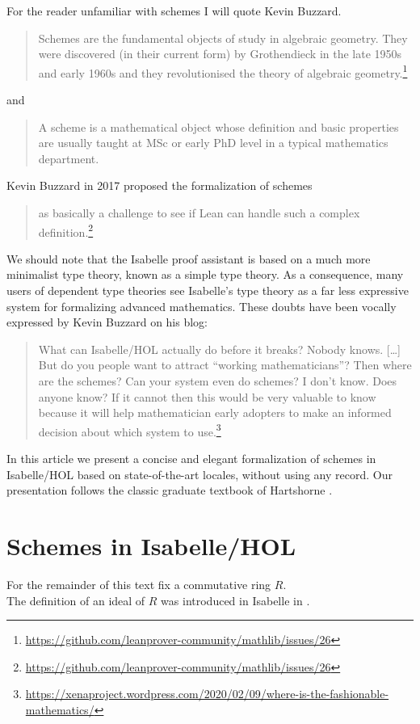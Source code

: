 \documentclass[12pt]{scrartcl}
\begin{document}
For the reader unfamiliar with schemes I will quote Kevin Buzzard.
\begin{quote}
	Schemes are the fundamental objects of study in algebraic geometry. They were discovered (in their current form) by Grothendieck in the late 1950s and early 1960s and they revolutionised the theory of algebraic geometry.\footnote{\url{https://github.com/leanprover-community/mathlib/issues/26}} 
\end{quote}
and
\begin{quote}
	A scheme is a mathematical object whose definition and basic properties are usually taught at MSc or early PhD level in a typical mathematics department.
\end{quote}	
Kevin Buzzard in 2017 proposed the formalization of schemes 
\begin{quote}
	as basically a challenge to see if Lean can handle such a complex definition.\footnote{\url{https://github.com/leanprover-community/mathlib/issues/26}} 
\end{quote}
We should note that the Isabelle proof assistant is based on a much more minimalist type theory, known as a simple type theory. As a consequence, many users of dependent type theories see Isabelle's type theory as a far less expressive system for formalizing advanced mathematics.  These doubts have been vocally expressed by Kevin Buzzard on his blog:
\begin{quote}
	What can Isabelle/HOL actually do before it breaks? Nobody knows. [\dots] But do you people want to attract “working mathematicians”? Then where are the schemes? Can your system even do schemes? I don’t know. Does anyone know? If it cannot then this would be very valuable to know because it will help mathematician early adopters to make an informed decision about which system to use.\footnote{\url{https://xenaproject.wordpress.com/2020/02/09/where-is-the-fashionable-mathematics/}}
\end{quote}
In this article we present a concise and elegant formalization of schemes in Isabelle/HOL based on state-of-the-art locales, without using any record. Our presentation follows the classic graduate textbook of Hartshorne \cite{hartshorne}. 			
 

\section{Schemes in Isabelle/HOL}
\label{sec:schemes}

For the remainder of this text fix a commutative ring $R$. \\
The definition of an ideal of $R$ was introduced in Isabelle in \cite{ballarin20}.
\end{document}
